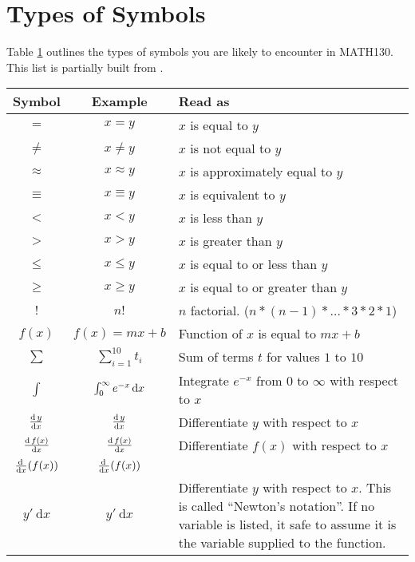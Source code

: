 \section{Types of Symbols}
\label{sec:TypesOfSymbols}
Table \ref{tab:TypesOfSymbols} outlines the types of symbols you are likely
to encounter in MATH130. This list is partially built from \citet{IjPb7}.
\begin{table}[!htb]
\label{tab:TypesOfSymbols}
\begin{tabularx}{\linewidth}{| c || c | X |}
  \hline
  Symbol & Example & Read as \\ \hline \hline
  $=$       & $ x = y$            & $x$ is equal to $y$                       \\
  $\neq$    & $ x \neq y$         & $x$ is not equal to $y$                   \\
  $\approx$ & $ x \approx y$      & $x$ is approximately equal to $y$         \\
  $\equiv$  & $ x \equiv y$       & $x$ is equivalent to $y$                  \\ \hline
  $<$       & $ x < y$            & $x$ is less than $y$                      \\
  $>$       & $ x > y$            & $x$ is greater than $y$                   \\
  $\leq$    & $ x \leq y$         & $x$ is equal to or less than $y$          \\
  $\geq$    & $ x \geq y$         & $x$ is equal to or greater than $y$       \\
  $!$       & $n!$                & $n$ factorial. ($n*(n-1)*\ldots*3*2*1$)   \\ \hline
  $f(x)$    & $ f(x) = mx + b$    & Function of $x$ is equal to $mx + b$      \\ \hline
  $\sum$    & $ \sum_{i=1}^{10} t_i$ & Sum of terms $t$ for values $1$ to $10$\\ \hline
  $\int$    & $\myint{0}{\infty}{e^{-x}}{x}$ & Integrate $e^{-x}$ from $0$ to $\infty$ with respect to $x$\\ \hline
  $\deriv{y}{x}$      & $\deriv{y}{x}$       & Differentiate $y$ with respect to $x$ \\
  $\deriv{f(x)}{x} $  & $\deriv{f(x)}{x} $   & Differentiate $f(x)$ with respect to $x$ \\
  $\lderiv{f(x)}{x}$  & $\lderiv{f(x)}{x}$   &                                \\
  $y'~\mathrm{d}x$    & $y'~\mathrm{d}x$     & Differentiate $y$ with respect to $x$. This is called ``Newton's notation''. If no variable is listed, it safe to assume it is the variable supplied to the function. \\

\end{tabularx}
\end{table}
